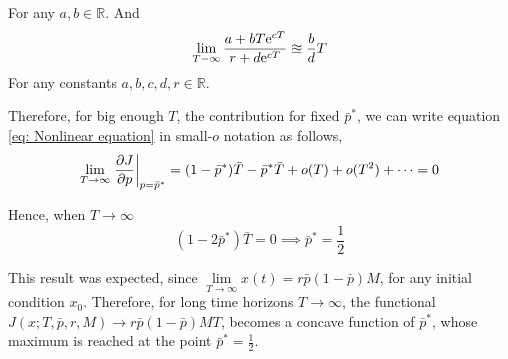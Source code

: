For any $a,b \in \mathbb{R}$. And
\begin{equation}
	\lim\limits_{T-\infty}\frac{a+bT\mathrm{e}^{cT}}{r+d\mathrm{e}^{cT}} \approxeq \frac{b}{d}T
\end{equation}
For any constants $a,b,c,d,r \in \mathbb{R}$. 

Therefore, for big enough $T$, the contribution for fixed $\bar{p}^*$, we can write equation \ref{eq: Nonlinear equation} in small-$o$ notation as follows,
\begin{equation}
\lim\limits_{T\rightarrow \infty}\left.\frac{\partial J}{{\partial p}}\right|_{p=\bar{p}^*} =(1-\bar{p}^*)\bar{T}-\bar{p}^*\bar{T}+o(T)+o(T^2)+\dots=0 
\end{equation}

Hence, when $T\rightarrow \infty$
\begin{equation}
	(1-2\bar{p}^*)\bar{T}=0\implies \bar{p}^*=\frac{1}{2}
\end{equation}

This result was expected, since 
$\lim\limits_{T\rightarrow\infty} x(t) = r\bar{p}(1-\bar{p})M$, for any initial condition $x_0$. Therefore, for long time horizons $T\rightarrow \infty$, the functional $J(x; T,\bar{p},r,M)\rightarrow r\bar{p}(1-\bar{p})MT$, becomes a concave function of $\bar{p}^*$, whose maximum is reached at the point $\bar{p}^*=\frac{1}{2}$.
